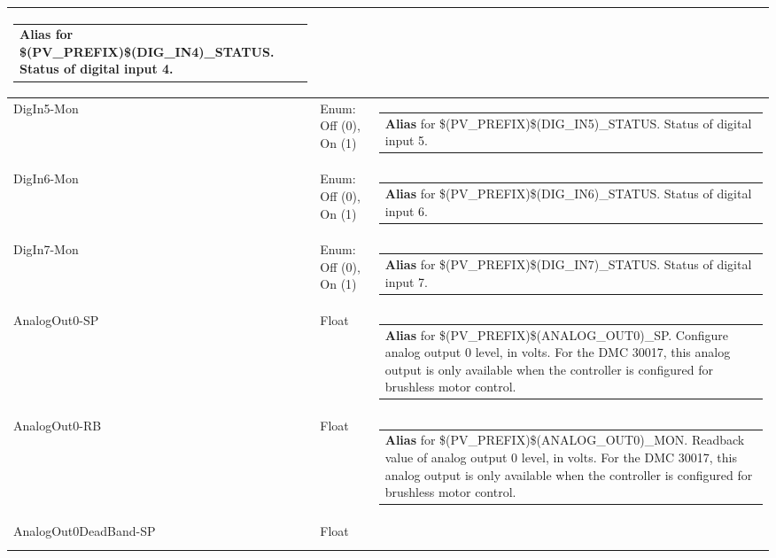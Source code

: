 \documentclass[openany]{article}
\begin{document}
\begin{longtable}{| m{4.5cm} m{2.5cm}  m{8.5cm} |}
\begin{tabular}{@{}m{6cm}@{}}
                \textbf{\color{blue} Alias} for \$(PV\_PREFIX)\$(DIG\_IN4)\_STATUS. Status of digital input 4.
            \end{tabular} \hypertarget{pv:dig-in-5}{}\\ \hline
        DigIn5-Mon & Enum: Off (0), On (1) & \begin{tabular}{@{}m{6cm}@{}}
                \textbf{\color{blue} Alias} for \$(PV\_PREFIX)\$(DIG\_IN5)\_STATUS. Status of digital input 5.
            \end{tabular} \hypertarget{pv:dig-in-6}{}\\ \hline
        DigIn6-Mon & Enum: Off (0), On (1) & \begin{tabular}{@{}m{6cm}@{}}
                \textbf{\color{blue} Alias} for \$(PV\_PREFIX)\$(DIG\_IN6)\_STATUS. Status of digital input 6.
            \end{tabular} \hypertarget{pv:dig-in-7}{}\\ \hline
        DigIn7-Mon & Enum: Off (0), On (1) & \begin{tabular}{@{}m{6cm}@{}}
                \textbf{\color{blue} Alias} for \$(PV\_PREFIX)\$(DIG\_IN7)\_STATUS. Status of digital input 7.
            \end{tabular} \hypertarget{pv:analog-out-0}{}\\ \hline
        AnalogOut0-SP & Float & \begin{tabular}{@{}m{6cm}@{}}
                \textbf{\color{blue} Alias} for \$(PV\_PREFIX)\$(ANALOG\_OUT0)\_SP. Configure analog output 0 level, in volts. For the DMC 30017, this analog output is only available when the controller is configured for brushless motor control.
            \end{tabular} \hypertarget{}{}\\ \hline
        AnalogOut0-RB & Float & \begin{tabular}{@{}m{6cm}@{}}
                \textbf{\color{blue} Alias} for \$(PV\_PREFIX)\$(ANALOG\_OUT0)\_MON. Readback value of analog output 0 level, in volts. For the DMC 30017, this analog output is only available when the controller is configured for brushless motor control.
            \end{tabular} \hypertarget{pv:analog-out-0-dead-band}{}\\ \hline
        AnalogOut0DeadBand-SP & Float & \begin{tabular}{@{}m{6cm}@{}}

\end{tabular}
\end{longtable}
\end{document}
